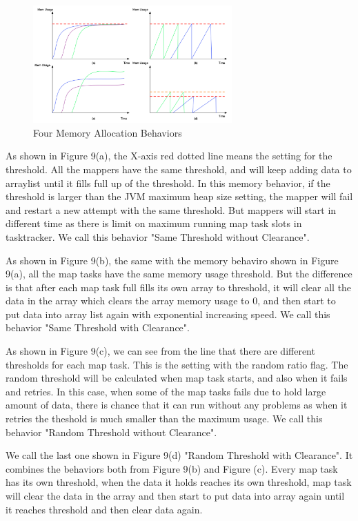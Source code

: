\begin{figure}[ht]
  \centering
    \includegraphics[width=3.0in]{image/workload.png}
    \caption{Four Memory Allocation Behaviors}
    \label{ref:memory_allocation}
\end{figure}

As shown in Figure 9(a), the X-axis red dotted line means the setting for the threshold. All the mappers have the same threshold, and will keep adding data to arraylist until it fills full up of the threshold. In this memory behavior, if the threshold is larger than the JVM maximum heap size setting, the mapper will fail and restart a new attempt with the same threshold. But mappers will start in different time as there is limit on maximum running map task slots in tasktracker. We call this behavior "Same Threshold without Clearance".

As shown in Figure 9(b), the same with the memory behaviro shown in Figure 9(a), all the map tasks have the same memory usage threshold. But the difference is that after each map task full fills its own array to threshold, it will clear all the data in the array which clears the array memory usage to 0, and then start to put data into array list again with exponential increasing speed. We call this behavior "Same Threshold with Clearance".

As shown in Figure 9(c), we can see from the line that there are different thresholds for each map task. This is the setting with the random ratio flag. The random threshold will be calculated when map task starts, and also when it fails and retries. In this case, when some of the map tasks fails due to hold large amount of data, there is chance that it can run without any problems as when it retries the theshold is much smaller than the maximum usage. We call this behavior "Random Threshold without Clearance".

We call the last one shown in Figure 9(d) "Random Threshold with Clearance". It combines the behaviors both from Figure 9(b) and Figure (c).  Every map task has its own threshold, when the data it holds reaches its own threshold, map task will clear the data in the array and then start to put data into array again until it reaches threshold and then clear data again.

